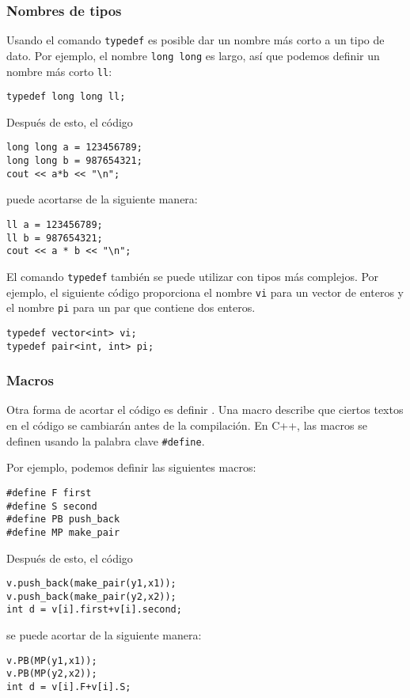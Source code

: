 \subsubsection{Nombres de tipos}
Usando el comando \texttt{typedef}
es posible dar un nombre más corto
a un tipo de dato.
Por ejemplo, el nombre \texttt{long long} es largo,
así que podemos definir un nombre más corto \texttt{ll}:
\begin{lstlisting}
typedef long long ll;
\end{lstlisting}
Después de esto, el código
\begin{lstlisting}
long long a = 123456789;
long long b = 987654321;
cout << a*b << "\n";
\end{lstlisting}
puede acortarse de la siguiente manera:
\begin{lstlisting}
ll a = 123456789;
ll b = 987654321;
cout << a * b << "\n";
\end{lstlisting}

El comando \texttt{typedef}
también se puede utilizar con tipos más complejos.
Por ejemplo, el siguiente código proporciona
el nombre \texttt{vi} para un vector de enteros
y el nombre \texttt{pi} para un par
que contiene dos enteros.
\begin{lstlisting}
typedef vector<int> vi;
typedef pair<int, int> pi;
\end{lstlisting}

\subsubsection{Macros}
Otra forma de acortar el código es definir
.
Una macro describe que ciertos textos en
el código se cambiarán antes de la compilación.
En C++, las macros se definen usando la
palabra clave \texttt{\#define}.

Por ejemplo, podemos definir las siguientes macros:
\begin{lstlisting}
#define F first
#define S second
#define PB push_back
#define MP make_pair
\end{lstlisting}
Después de esto, el código
\begin{lstlisting}
v.push_back(make_pair(y1,x1));
v.push_back(make_pair(y2,x2));
int d = v[i].first+v[i].second;
\end{lstlisting}
se puede acortar de la siguiente manera:
\begin{lstlisting}
v.PB(MP(y1,x1));
v.PB(MP(y2,x2));
int d = v[i].F+v[i].S;
\end{lstlisting}

